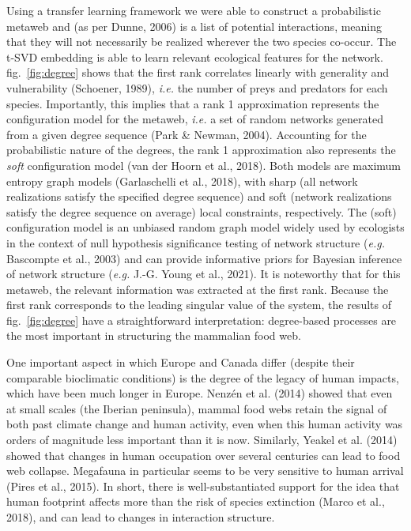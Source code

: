 \documentclass[11pt]{article}
\begin{document}
Using a transfer learning framework we were able to construct a
probabilistic metaweb and (as per Dunne, 2006) is a list of potential
interactions, meaning that they will not necessarily be realized
wherever the two species co-occur. The t-SVD embedding is able to learn
relevant ecological features for the network. fig.~\ref{fig:degree}
shows that the first rank correlates linearly with generality and
vulnerability (Schoener, 1989), \emph{i.e.} the number of preys and
predators for each species. Importantly, this implies that a rank 1
approximation represents the configuration model for the metaweb,
\emph{i.e.} a set of random networks generated from a given degree
sequence (Park \& Newman, 2004). Accounting for the probabilistic nature
of the degrees, the rank 1 approximation also represents the \emph{soft}
configuration model (van der Hoorn et al., 2018). Both models are
maximum entropy graph models (Garlaschelli et al., 2018), with sharp
(all network realizations satisfy the specified degree sequence) and
soft (network realizations satisfy the degree sequence on average) local
constraints, respectively. The (soft) configuration model is an unbiased
random graph model widely used by ecologists in the context of null
hypothesis significance testing of network structure (\emph{e.g.}
Bascompte et al., 2003) and can provide informative priors for Bayesian
inference of network structure (\emph{e.g.} J.-G. Young et al., 2021).
It is noteworthy that for this metaweb, the relevant information was
extracted at the first rank. Because the first rank corresponds to the
leading singular value of the system, the results of
fig.~\ref{fig:degree} have a straightforward interpretation:
degree-based processes are the most important in structuring the
mammalian food web.

One important aspect in which Europe and Canada differ (despite their
comparable bioclimatic conditions) is the degree of the legacy of human
impacts, which have been much longer in Europe. Nenzén et al. (2014)
showed that even at small scales (the Iberian peninsula), mammal food
webs retain the signal of both past climate change and human activity,
even when this human activity was orders of magnitude less important
than it is now. Similarly, Yeakel et al. (2014) showed that changes in
human occupation over several centuries can lead to food web collapse.
Megafauna in particular seems to be very sensitive to human arrival
(Pires et al., 2015). In short, there is well-substantiated support for
the idea that human footprint affects more than the risk of species
extinction (Marco et al., 2018), and can lead to changes in interaction
structure.
\end{document}
